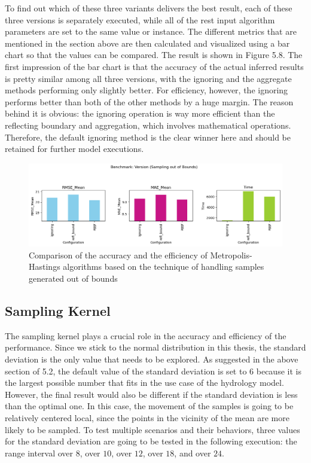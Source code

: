 To find out which of these three variants delivers the best result, each of these three versions is separately executed, while all of the rest input algorithm parameters are set to the same value or instance. The different metrics that are mentioned in the section above are then calculated and visualized using a bar chart so that the values can be compared. The result is shown in Figure 5.8. The first impression of the bar chart is that the accuracy of the actual inferred results is pretty similar among all three versions, with the ignoring and the aggregate methods performing only slightly better. For efficiency, however, the ignoring performs better than both of the other methods by a huge margin. The reason behind it is obvious: the ignoring operation is way more efficient than the reflecting boundary and aggregation, which involves mathematical operations. Therefore, the default ignoring method is the clear winner here and should be retained for further model executions.


\begin{figure}[H]
    \centering
    \includegraphics[width=1\textwidth]{figures/basic_mh/benchmark/sampling_otb.png}
    \captionsetup{width=.8\textwidth}
    \caption{Comparison of the accuracy and the efficiency of Metropolis-Hastings algorithms based on the technique of handling samples generated out of bounds}
    \label{fig:enter-label}
\end{figure}



\subsection{Sampling Kernel}
The sampling kernel plays a crucial role in the accuracy and efficiency of the performance. Since we stick to the normal distribution in this thesis, the standard deviation is the only value that needs to be explored. As suggested in the above section of 5.2, the default value of the standard deviation is set to $6$ because it is the largest possible number that fits in the use case of the hydrology model. However, the final result would also be different if the standard deviation is less than the optimal one. In this case, the movement of the samples is going to be relatively centered local, since the points in the vicinity of the mean are more likely to be sampled. To test multiple scenarios and their behaviors, three values for the standard deviation are going to be tested in the following execution: the range interval over $8$, over $10$, over $12$, over $18$, and over $24$.

